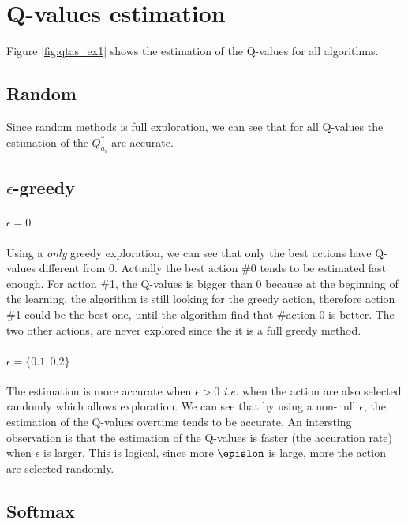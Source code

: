 \documentclass[letterpaper]{article}
\begin{document}
\section{Q-values estimation}

Figure \ref{fig:qtas_ex1} shows the estimation of the Q-values for all algorithms.

\subsection*{Random}

Since random methods is full exploration, we can see that for all Q-values
the estimation of the $Q^*_{a_i}$ are accurate.


\subsection{$\epsilon$-greedy}

\paragraph{$\epsilon = 0$} Using a \textit{only} greedy exploration, we
can see that only the best actions have Q-values different from 0. Actually
the best action \#0 tends to be estimated fast enough. For action \#1, the
Q-values is bigger than 0 because at the beginning of the learning, the
algorithm is still looking for the greedy action, therefore action \#1
could be the best one, until the algorithm find that \#action 0 is better.
The two other actions, are never explored since the it is a full greedy
method.

\paragraph{$\epsilon = \{0.1, 0.2\}$}

The estimation is more accurate when $\epsilon > 0$ \textit{i.e.} when
the action are also selected randomly which allows exploration. We can see
that by using a non-null $\epsilon$, the estimation of the Q-values overtime
tends to be accurate. An intersting observation is that the estimation
of the Q-values is faster (the accuration rate)
when $\epsilon$ is larger. This is logical,
since more $\epislon$ is large, more the action are selected randomly.

\subsection*{Softmax}
\end{document}
